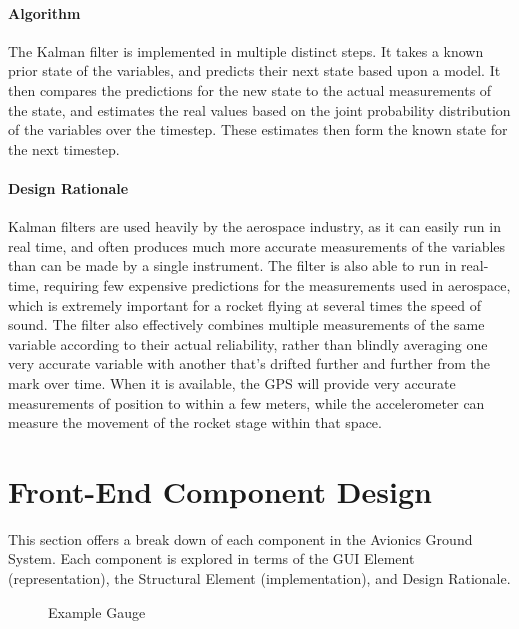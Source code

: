 \documentclass[journal,10pt,onecolumn,compsoc]{IEEEtran}
\begin{document}
			\paragraph{Algorithm}
				\noindent The Kalman filter is implemented in multiple distinct steps.
				It takes a known prior state of the variables, and predicts their next state based upon a model.
				It then compares the predictions for the new state to the actual measurements of the state, and estimates the real values based on the joint probability distribution of the variables over the timestep.
				These estimates then form the known state for the next timestep.
				
			\paragraph{Design Rationale}
				\noindent Kalman filters are used heavily by the aerospace industry, as it can easily run in real time, and often produces much more accurate measurements of the variables than can be made by a single instrument.
				The filter is also able to run in real-time, requiring few expensive predictions for the measurements used in aerospace, which is extremely important for a rocket flying at several times the speed of sound.
				The filter also effectively combines multiple measurements of the same variable according to their actual reliability, rather than blindly averaging one very accurate variable with another that's drifted further and further from the mark over time.
				When it is available, the GPS will provide very accurate measurements of position to within a few meters, while the accelerometer can measure the movement of the rocket stage within that space.
				
		\setlength\parindent{24pt}

\section{Front-End Component Design}

	\noindent This section offers a break down of each component in the Avionics Ground System.
	Each component is explored in terms of the GUI Element (representation), the Structural Element (implementation), and Design Rationale.

  \begin{figure}[H]
\centering
{}
\caption{Example Gauge}
\end{figure}
\end{document}
